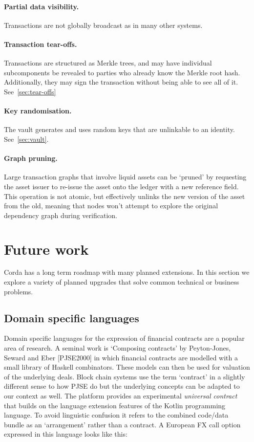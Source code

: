 \documentclass{article}
\begin{document}
\paragraph{Partial data visibility.}Transactions are not globally broadcast as in many other systems.
\paragraph{Transaction tear-offs.}Transactions are structured as Merkle trees, and may have individual subcomponents be
revealed to parties who already know the Merkle root hash. Additionally, they may sign the transaction without being
able to see all of it. See~\cref{sec:tear-offs}
\paragraph{Key randomisation.}The vault generates and uses random keys that are unlinkable to an identity. See~\cref{sec:vault}.
\paragraph{Graph pruning.}Large transaction graphs that involve liquid assets can be `pruned' by requesting the asset
issuer to re-issue the asset onto the ledger with a new reference field. This operation is not atomic, but effectively
unlinks the new version of the asset from the old, meaning that nodes won't attempt to explore the original dependency
graph during verification.

\section{Future work}

Corda has a long term roadmap with many planned extensions. In this section we explore a variety of planned upgrades
that solve common technical or business problems.

\subsection{Domain specific languages}

Domain specific languages for the expression of financial contracts are a popular area of research. A seminal work
is `Composing contracts' by Peyton-Jones, Seward and Eber [PJSE2000\cite{PeytonJones:2000:CCA:357766.351267}] in
which financial contracts are modelled with a small library of Haskell combinators. These models can then be used
for valuation of the underlying deals. Block chain systems use the term `contract' in a slightly different sense to
how PJSE do but the underlying concepts can be adapted to our context as well. The platform provides an
experimental \emph{universal contract} that builds on the language extension features of the Kotlin programming
language. To avoid linguistic confusion it refers to the combined code/data bundle as an `arrangement' rather than
a contract. A European FX call option expressed in this language looks like this:
\end{document}
